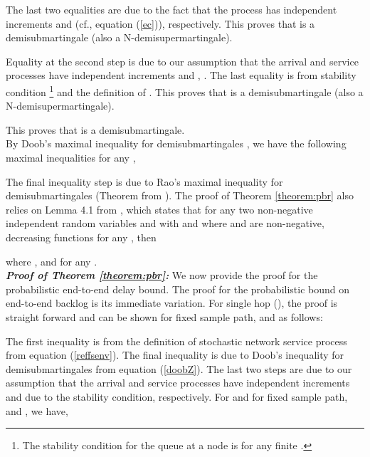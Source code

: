 \documentclass[letterpaper]{IEEEtran}
\begin{document}
\normalsize
The last two equalities are due to the fact that the process  has independent increments and  (cf., equation (\ref{ec})), respectively.  This proves that  is a demisubmartingale (also a N-demisupermartingale). 
\small

\normalsize
Equality at the second step is due to our assumption that the arrival  and service   processes have independent increments and , . The last equality is from stability condition \footnote{The stability condition for the queue at a node is  for any finite .} and the definition of . This proves that  is a demisubmartingale (also a N-demisupermartingale).
\small 

\normalsize
This proves that  is a demisubmartingale.\\
By Doob's maximal inequality for demisubmartingales \cite{chris:2003,rao:2007}, we have the following maximal inequalities for any ,
\small

\normalsize
The final inequality step is due to Rao's maximal inequality for demisubmartingales (Theorem  from \cite{rao:2007}). The proof of Theorem \ref{theorem:pbr} also relies on Lemma 4.1 from \cite{yuming:2006}, which states that for any two non-negative independent random variables  and  with  and  where  and  are non-negative, decreasing functions for any , then 

where ,  and  for any .\\
\textbf{\textit{Proof of Theorem \ref{theorem:pbr}:}} We now provide the proof for the probabilistic end-to-end delay bound. The proof for the probabilistic bound on end-to-end backlog is its immediate variation. For single hop (), the proof is straight forward and can be shown for fixed sample path,  and  as follows:
\small

\normalsize
The first inequality is from the definition of stochastic network service process from equation (\ref{reffsenv}). The final inequality is due to Doob's inequality for demisubmartingales from equation (\ref{doobZ}). The last two steps are due to our assumption that the arrival  and service   processes have independent increments and due to the stability condition, respectively. For  and for fixed sample path,  and , we have,
\small
\end{document}

